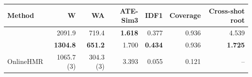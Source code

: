 \begin{tabular}{lrrrrrr}
\toprule
Method & W & WA & ATE-Sim3 & IDF1 & Coverage & Cross-shot root \\
\midrule
\humanthree{} & 2091.9 & 719.4 & \textbf{1.618} & 0.377 & 0.936 & 4.539 \\
\method{} & \textbf{1304.8} & \textbf{651.2} & 1.700 & \textbf{0.434} & 0.936 & \textbf{1.725} \\
\midrule
OnlineHMR & 1065.7 (3) & 304.3 (3) & 3.393 & 0.055 & 0.121 & -- \\
\bottomrule
\end{tabular}
